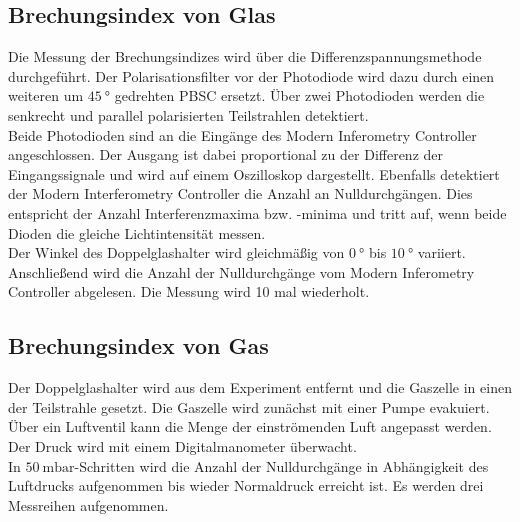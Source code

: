 \subsection{Brechungsindex von Glas}
Die Messung der Brechungsindizes wird über die Differenzspannungsmethode durchgeführt.
Der Polarisationsfilter vor der Photodiode wird dazu durch einen weiteren um $\qty{45}{\degree}$ gedrehten PBSC ersetzt.
Über zwei Photodioden werden die senkrecht und parallel polarisierten Teilstrahlen detektiert.
\\
Beide Photodioden sind an die Eingänge des Modern Inferometry Controller angeschlossen.
Der Ausgang ist dabei proportional zu der Differenz der Eingangssignale und wird auf einem Oszilloskop dargestellt.
Ebenfalls detektiert der Modern Interferometry Controller die Anzahl an Nulldurchgängen.
Dies entspricht der Anzahl Interferenzmaxima bzw. -minima und tritt auf, wenn beide Dioden die gleiche Lichtintensität messen.
\\
Der Winkel des Doppelglashalter wird gleichmäßig von $\qty{0}{\degree}$ bis $\qty{10}{\degree}$ variiert.
Anschließend wird die Anzahl der Nulldurchgänge vom Modern Inferometry Controller abgelesen.
Die Messung wird 10 mal wiederholt.

\subsection{Brechungsindex von Gas}
Der Doppelglashalter wird aus dem Experiment entfernt und die Gaszelle in einen der Teilstrahle gesetzt.
Die Gaszelle wird zunächst mit einer Pumpe evakuiert.
Über ein Luftventil kann die Menge der einströmenden Luft angepasst werden.
Der Druck wird mit einem Digitalmanometer überwacht.
\\
In $\qty{50}{\milli\bar}$-Schritten wird die Anzahl der Nulldurchgänge in Abhängigkeit des Luftdrucks aufgenommen bis wieder Normaldruck erreicht ist.
Es werden drei Messreihen aufgenommen.